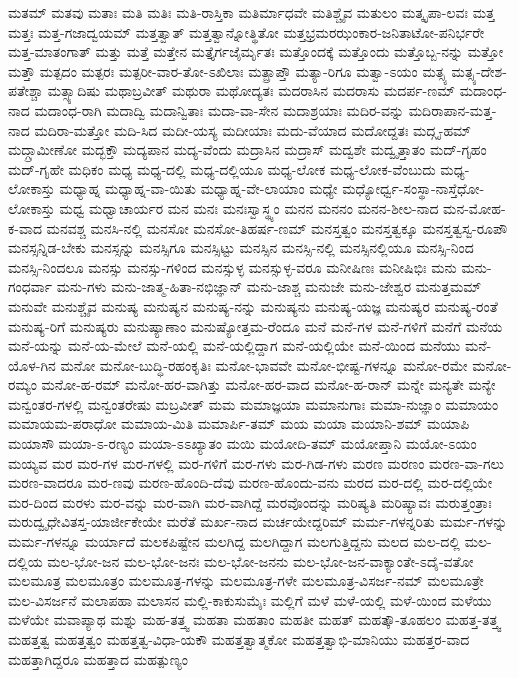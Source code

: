 {ಮತಮ್
ಮತವು
ಮತಾಃ
ಮತಿ
ಮತಿಃ
ಮತಿ-ರಾಸ್ತಿಕಾ
ಮತಿರ್ಮಾಧವೇ
ಮತಿಶ್ಚೈವ
ಮತುಲಂ
ಮತ್ಕೃಪಾ-ಲವಃ
ಮತ್ತ
ಮತ್ತಃ
ಮತ್ತ-ಗಜಾದ್ವಯಮ್
ಮತ್ತತ್ವಾತ್
ಮತ್ತತ್ವಾನ್ನೋತ್ಥಿತೋ
ಮತ್ತಭ್ರಮರಝಂಕಾರ-ಜನಿತಾಟೋ-ಪನಿರ್ಭರೇ
ಮತ್ತ-ಮಾತಂಗಾತ್
ಮತ್ತು
ಮತ್ತೆ
ಮತ್ತೇನ
ಮತ್ತೈರ್ಗಜೈರ್ಮೃತಃ
ಮತ್ತೊಂದಕ್ಕೆ
ಮತ್ತೊಂದು
ಮತ್ತೊಬ್ಬ-ನನ್ನು
ಮತ್ತೋ
ಮತ್ತೌ
ಮತ್ಪದಂ
ಮತ್ಪರಃ
ಮತ್ಪರೀ-ವಾರ-ತೋ-ಽಖಿಲಾಃ
ಮತ್ಪ್ರಾಪ್ತೌ
ಮತ್ಯಾ-ರಿಗೂ
ಮತ್ವಾ-ಽಯಂ
ಮತ್ಸ್ಯ
ಮತ್ಸ್ಯ-ದೇಶ-ಪತೇಶ್ಚಾ
ಮತ್ಸ್ಯಾದಿಷು
ಮಥಾಬ್ರವೀತ್
ಮಥುರಾ
ಮಥೋದ್ಯತಃ
ಮದರಾಸಿನ
ಮದರಾಸು
ಮದರ್ಪ-ಣಮ್
ಮದಾಂಧ-ನಾದ
ಮದಾಂಧ-ರಾಗಿ
ಮದಾದ್ವಿ
ಮದಾನ್ವಿತಾಃ
ಮದಾ-ವಾ-ಸೇನ
ಮದಾಶ್ರಯಾಃ
ಮದಿರ-ವನ್ನು
ಮದಿರಾಪಾನ-ಮತ್ತ-ನಾದ
ಮದಿರಾ-ಮತ್ತೋ
ಮದಿ-ಸಿದ
ಮದೀ-ಯಸ್ಯ
ಮದೀಯಾಃ
ಮದು-ವೆಯಾದ
ಮದೋದ್ದತಃ
ಮದ್ಗೃ-ಹಮ್
ಮದ್ಗ್ರಾಮೀಣೋ
ಮದ್ಭಕ್ತೌ
ಮದ್ಯಪಾನ
ಮದ್ಯ-ವೆಂದು
ಮದ್ರಾಸಿನ
ಮದ್ರಾಸ್
ಮದ್ವಶೇ
ಮದ್ವೃತ್ತಾತಂ
ಮದ್-ಗೃಹಂ
ಮದ್-ಗೃಹೇ
ಮಧಿಕಂ
ಮಧ್ಯ
ಮಧ್ಯ-ದಲ್ಲಿ
ಮಧ್ಯ-ದಲ್ಲಿಯೂ
ಮಧ್ಯ-ಲೋಕ
ಮಧ್ಯ-ಲೋಕ-ವೆಂಬುದು
ಮಧ್ಯ-ಲೋಕಾಸ್ತು
ಮಧ್ಯಾಹ್ನ
ಮಧ್ಯಾಹ್ನ-ವಾ-ಯಿತು
ಮಧ್ಯಾಹ್ನ-ವೇ-ಲಾಯಾಂ
ಮಧ್ಯೇ
ಮಧ್ಯೋರ್ಧ್ವ-ಸಂಸ್ಥಾ-ನಾಸ್ತೆಧೋ-ಲೋಕಾಸ್ತು
ಮಧ್ವ
ಮಧ್ವಾಚಾರ್ಯರ
ಮನ
ಮನಃ
ಮನಃಸ್ವಾಸ್ಥ್ಯಂ
ಮನನ
ಮನನಂ
ಮನನ-ಶೀಲ-ನಾದ
ಮನ-ಮೋಹ-ಕ-ವಾದ
ಮನವಶ್ಚ
ಮನಸಿ-ನಲ್ಲಿ
ಮನಸೋ
ಮನಸೋ-ತಿಹರ್ಷ-ಣಮ್
ಮನಸ್ತತ್ವಂ
ಮನಸ್ತತ್ವಕ್ಕೂ
ಮನಸ್ತತ್ವಸ್ವ-ರೂಪೌ
ಮನಸ್ಸನ್ನಿಡ-ಬೇಕು
ಮನಸ್ಸನ್ನು
ಮನಸ್ಸಿಗೂ
ಮನಸ್ಸಿಟ್ಟು
ಮನಸ್ಸಿನ
ಮನಸ್ಸಿ-ನಲ್ಲಿ
ಮನಸ್ಸಿನಲ್ಲಿಯೂ
ಮನಸ್ಸಿ-ನಿಂದ
ಮನಸ್ಸಿ-ನಿಂದಲೂ
ಮನಸ್ಸು
ಮನಸ್ಸು-ಗಳಿಂದ
ಮನಸ್ಸುಳ್ಳ
ಮನಸ್ಸುಳ್ಳ-ವರೂ
ಮನೀಷಿಣಃ
ಮನೀಷಿಭಿಃ
ಮನು
ಮನು-ಗಂಧರ್ವಾ
ಮನು-ಗಳು
ಮನು-ಜಾತ್ಮ-ಹಿತಾ-ನಭಿಜ್ಞಾನ್
ಮನು-ಜಾಶ್ಚ
ಮನುಜೇ
ಮನು-ಜೇಶ್ವರ
ಮನುತ್ತಮಮ್
ಮನುವೇ
ಮನುಶ್ಚೈವ
ಮನುಷ್ಯ
ಮನುಷ್ಯನ
ಮನುಷ್ಯ-ನನ್ನು
ಮನುಷ್ಯನು
ಮನುಷ್ಯ-ಯಜ್ಞ
ಮನುಷ್ಯರ
ಮನುಷ್ಯ-ರಂತೆ
ಮನುಷ್ಯ-ರಿಗೆ
ಮನುಷ್ಯರು
ಮನುಷ್ಯಾಣಾಂ
ಮನುಷ್ಯೋತ್ತಮ-ರೆಂದೂ
ಮನೆ
ಮನೆ-ಗಳ
ಮನೆ-ಗಳಿಗೆ
ಮನೆಗೆ
ಮನೆಯ
ಮನೆ-ಯನ್ನು
ಮನೆ-ಯ-ಮೇಲೆ
ಮನೆ-ಯಲ್ಲಿ
ಮನೆ-ಯಲ್ಲಿದ್ದಾಗ
ಮನೆ-ಯಲ್ಲಿಯೇ
ಮನೆ-ಯಿಂದ
ಮನೆಯು
ಮನೆ-ಯೊಳ-ಗಿನ
ಮನೋ
ಮನೋ-ಬುದ್ಧಿ-ರಹಂಕೃತಿಃ
ಮನೋ-ಭಾವವೇ
ಮನೋ-ಭೀಷ್ಟ-ಗಳನ್ನೂ
ಮನೋ-ರಮೇ
ಮನೋ-ರಮ್ಯಂ
ಮನೋ-ಹ-ರಮ್
ಮನೋ-ಹರ-ವಾಗಿತ್ತು
ಮನೋ-ಹರ-ವಾದ
ಮನೋ-ಹ-ರಾನ್
ಮನ್ನೇ
ಮನ್ಯತೇ
ಮನ್ಯೇ
ಮನ್ವಂತರ-ಗಳಲ್ಲಿ
ಮನ್ವಂತರೇಷು
ಮಬ್ರವೀತ್
ಮಮ
ಮಮಾಜ್ಞಯಾ
ಮಮಾನುಗಾಃ
ಮಮಾ-ನುಜ್ಞಾಂ
ಮಮಾಯಂ
ಮಮಾಯಮ-ಪರಾಧೋ
ಮಮಾಯ-ಮಿತಿ
ಮಮಾರ್ಪಿ-ತಮ್
ಮಯ
ಮಯಾ
ಮಯಾನಿ-ಶಮ್
ಮಯಾಪಿ
ಮಯಾಸೌ
ಮಯಾ-ಽ-ರಣ್ಯಂ
ಮಯಾ-ಽಽಖ್ಯಾತಂ
ಮಯಿ
ಮಯೋದಿ-ತಮ್
ಮಯೋಪ್ತಾನಿ
ಮಯೋ-ಽಯಂ
ಮಯ್ಯವ
ಮರ
ಮರ-ಗಳ
ಮರ-ಗಳಲ್ಲಿ
ಮರ-ಗಳಿಗೆ
ಮರ-ಗಳು
ಮರ-ಗಿಡ-ಗಳು
ಮರಣ
ಮರಣಂ
ಮರಣ-ವಾ-ಗಲು
ಮರಣ-ವಾದರೂ
ಮರ-ಣವು
ಮರಣ-ಹೊಂದಿ-ದೆವು
ಮರಣ-ಹೊಂದು-ವನು
ಮರದ
ಮರ-ದಲ್ಲಿ
ಮರ-ದಲ್ಲಿಯೇ
ಮರ-ದಿಂದ
ಮರಳು
ಮರ-ವನ್ನು
ಮರ-ವಾಗಿ
ಮರ-ವಾಗಿದ್ದೆ
ಮರವೊಂದನ್ನು
ಮರಿಷ್ಯತಿ
ಮರಿಷ್ಯಾವಃ
ಮರುತ್ತಂತ್ರಾಃ
ಮರುದ್ವೃಧೇವಿತಸ್ತ-ಯಾರ್ಜೀಕೇಯೇ
ಮರೆತೆ
ಮರ್ಖ-ನಾದ
ಮರ್ಚಯೇದ್ದರಿಮ್
ಮರ್ಮ-ಗಳನ್ನರಿತು
ಮರ್ಮ-ಗಳನ್ನು
ಮರ್ಮ-ಗಳನ್ನೂ
ಮರ್ಯಾದೆ
ಮಲಕಪಿಷ್ಟೇನ
ಮಲಗಿದ್ದ
ಮಲಗಿದ್ದಾಗ
ಮಲಗುತ್ತಿದ್ದನು
ಮಲದ
ಮಲ-ದಲ್ಲಿ
ಮಲ-ದಲ್ಲಿಯ
ಮಲ-ಭೋ-ಜನ
ಮಲ-ಭೋ-ಜನಃ
ಮಲ-ಭೋ-ಜನನು
ಮಲ-ಭೋ-ಜನ-ವಾಕ್ಯಾಂತೇ-ಽದೈ-ವತೋ
ಮಲಮೂತ್ರ
ಮಲಮೂತ್ರಂ
ಮಲಮೂತ್ರ-ಗಳನ್ನು
ಮಲಮೂತ್ರ-ಗಳೇ
ಮಲಮೂತ್ರ-ವಿಸರ್ಜ-ನಮ್
ಮಲಮೂತ್ರೇ
ಮಲ-ವಿಸರ್ಜನೆ
ಮಲಾಪಹಾ
ಮಲಾಸನ
ಮಲ್ಲಿ-ಕಾಕುಸುಮೈಃ
ಮಲ್ಲಿಗೆ
ಮಳೆ
ಮಳೆ-ಯಲ್ಲಿ
ಮಳೆ-ಯಿಂದ
ಮಳೆಯು
ಮಳೆಯೇ
ಮವಾಪ್ಯಾಥ
ಮಶ್ನು
ಮಹ-ತತ್ತ್ವ
ಮಹತಾ
ಮಹತಾಂ
ಮಹತೀ
ಮಹತ್
ಮಹತ್ಕೌ-ತೂಹಲಂ
ಮಹತ್ತ-ತತ್ತ್ವ
ಮಹತ್ತತ್ವ
ಮಹತ್ತತ್ವಂ
ಮಹತ್ತತ್ವ-ವಿಧಾ-ಯಕೌ
ಮಹತ್ತತ್ವಾತ್ಮಕೋ
ಮಹತ್ತತ್ವಾಭಿ-ಮಾನಿಯು
ಮಹತ್ತರ-ವಾದ
ಮಹತ್ತಾಗಿದ್ದರೂ
ಮಹತ್ತಾದ
ಮಹತ್ಪುಣ್ಯಂ
}
